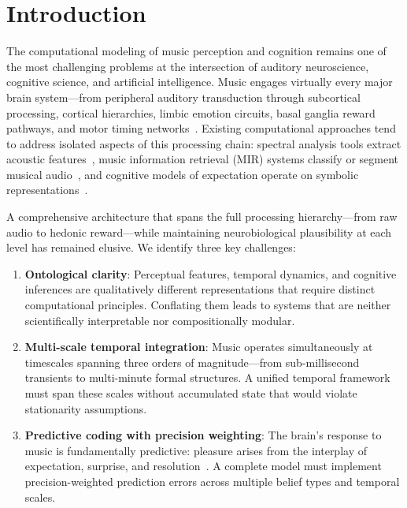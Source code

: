 \documentclass[10pt,twocolumn]{article}
\begin{document}
\section{Introduction}
\label{sec:intro}

The computational modeling of music perception and cognition remains one of the most challenging problems at the intersection of auditory neuroscience, cognitive science, and artificial intelligence.
Music engages virtually every major brain system---from peripheral auditory transduction through subcortical processing, cortical hierarchies, limbic emotion circuits, basal ganglia reward pathways, and motor timing networks~\cite{zatorre2007,janata2009,salimpoor2011}.
Existing computational approaches tend to address isolated aspects of this processing chain: spectral analysis tools extract acoustic features~\cite{mcfee2015librosa}, music information retrieval (MIR) systems classify or segment musical audio~\cite{mueller2015fundamentals}, and cognitive models of expectation operate on symbolic representations~\cite{pearce2018idyom}.

A comprehensive architecture that spans the full processing hierarchy---from raw audio to hedonic reward---while maintaining neurobiological plausibility at each level has remained elusive.
We identify three key challenges:
\begin{enumerate}[leftmargin=*,nosep]
    \item \textbf{Ontological clarity}: Perceptual features, temporal dynamics, and cognitive inferences are qualitatively different representations that require distinct computational principles. Conflating them leads to systems that are neither scientifically interpretable nor compositionally modular.
    \item \textbf{Multi-scale temporal integration}: Music operates simultaneously at timescales spanning three orders of magnitude---from sub-millisecond transients to multi-minute formal structures. A unified temporal framework must span these scales without accumulated state that would violate stationarity assumptions.
    \item \textbf{Predictive coding with precision weighting}: The brain's response to music is fundamentally predictive: pleasure arises from the interplay of expectation, surprise, and resolution~\cite{huron2006,salimpoor2011,gold2019}. A complete model must implement precision-weighted prediction errors across multiple belief types and temporal scales.
\end{enumerate}
\end{document}
